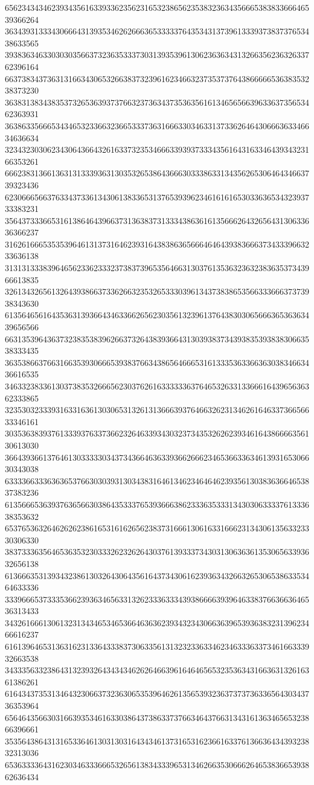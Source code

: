 65623434346239343561633933623562316532386562353832363435666538383366646539366264
36343931333430666431393534626266636533333764353431373961333937383737653438633565
39383634633030303566373236353337303139353961306236363431326635623632633762396164
66373834373631316634306532663837323961623466323735373764386666653638353238373230
36383138343835373265363937376632373634373536356161346565663963363735653462363931
36386335666534346532336632366533373631666330346331373362646430666363346634636634
32343230306234306436643261633732353466633939373334356164316334643934323166353261
66623831366136313133393631303532653864366630333863313435626530646434663739323436
62306665663763343733613430613833653137653939623461616165303363653432393733383231
35643733366531613864643966373136383731333438636161356662643265643130633636366237
31626166653535396461313731646239316438386365666464643938366637343339663233636138
31313133383964656233623332373837396535646631303761353632363238363537343966613835
32613432656132643938663733626632353265333039613437383865356633366637373938343630
61356465616435363139366434633662656230356132396137643830306566636536363439656566
66313539643637323835383962663732643839366431303938373439383539383830663538333435
36353866376631663539306665393837663438656466653161333536336636303834663436616535
34633238336130373835326665623037626163333336376465326331336661643965636362333865
32353032333931633163613030653132613136663937646632623134626164633736656633346161
30353638393761333937633736623264633934303237343532626239346164386666356130613030
36643936613764613033333034373436646363393662666234653663363461393165306630343038
63333663336363653766303039313034383164613462346464623935613038363664653837383236
61356665363937636566303864353337653936663862333635333134303063333761333638353632
65376536326462626238616531616265623837316661306163316662313430613563323330306330
38373336356465363532303332623262643037613933373430313063636135306563393632656138
61366635313934323861303264306435616437343061623936343266326530653863353464633336
33396665373335366239363465633132623336333439386666393964633837663663646536313433
34326166613061323134346534653664636362393432343066363965393638323139623466616237
61613964653136316231336433383730633561313232336334623463336337346166333932663538
34333563323864313239326434343462626466396164646565323536343166363132616361386261
61643437353134643230663732363065353964626135653932363737373633656430343736353964
65646435663031663935346163303864373863373766346437663134316136346565323866396661
35356438643131653364613031303164343461373165316236616337613663643439323832313036
65363333643162303463336665326561383433396531346266353066626465383665393862636434

